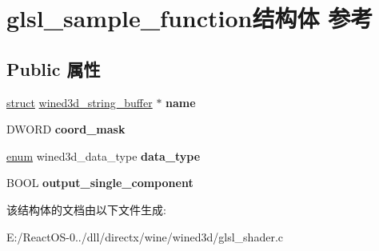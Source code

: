 \hypertarget{structglsl__sample__function}{}\section{glsl\+\_\+sample\+\_\+function结构体 参考}
\label{structglsl__sample__function}
\subsection*{Public 属性}
\begin{DoxyCompactItemize}
\item 
\mbox{\label{structglsl__sample__function_a3a49c3de4ea11b7cd09781f5163cfdad}} 
\hyperlink{interfacestruct}{struct} \hyperlink{structwined3d__string__buffer}{wined3d\+\_\+string\+\_\+buffer} $\ast$ {\bfseries name}
\item 
\mbox{\label{structglsl__sample__function_a57903b5bc277b9452ee8a1c1da4b11b3}} 
D\+W\+O\+RD {\bfseries coord\+\_\+mask}
\item 
\mbox{\label{structglsl__sample__function_a012b5a590186431e795e8993db23445a}} 
\hyperlink{interfaceenum}{enum} wined3d\+\_\+data\+\_\+type {\bfseries data\+\_\+type}
\item 
\mbox{\label{structglsl__sample__function_af84bb8469d27ef67b499fa547a4420b1}} 
B\+O\+OL {\bfseries output\+\_\+single\+\_\+component}
\end{DoxyCompactItemize}


该结构体的文档由以下文件生成\+:\begin{DoxyCompactItemize}
\item 
E\+:/\+React\+O\+S-\/0../dll/directx/wine/wined3d/glsl\+\_\+shader.\+c\end{DoxyCompactItemize}
